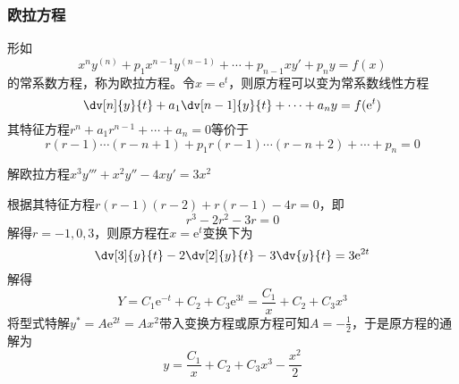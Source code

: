\subsubsection{欧拉方程}
形如
\[ x^ny^{(n)} + p_1x^{n-1}y^{(n-1)} + \cdots + p_{n-1}xy' + p_n y = f(x) \]
的常系数方程，称为欧拉方程。令$x=\mathrm{e}^t$，则原方程可以变为常系数线性方程
\[ \dv[n]{y}{t} + a_1\dv[n-1]{y}{t} + \cdots + a_ny = f(\mathrm{e}^t) \]
其特征方程$r^n + a_1r^{n-1}+\cdots+ a_n = 0$等价于
\[ r(r-1) \cdots (r-n+1) + p_1r(r-1) \cdots (r-n+2) + \cdots + p_n = 0 \]

\begin{example}
    解欧拉方程$x^3y''' + x^2y'' -4xy' = 3x^2$
\end{example}
\begin{solution}
    根据其特征方程$r(r-1)(r-2) + r(r-1) -4r = 0$，即
    \[ r^3 - 2r^2 -3r = 0 \]
    解得$r = -1,0,3$，则原方程在$x=\mathrm{e}^t$变换下为
    \[ \dv[3]{y}{t} -2\dv[2]{y}{t} - 3\dv{y}{t} = 3\mathrm{e}^{2t} \]
    解得
    \[ Y = C_1\mathrm{e}^{-t} + C_2 + C_3\mathrm{e}^{3t} = \frac{C_1}{x} + C_2 + C_3x^3 \]
    将型式特解$y^* = A\mathrm{e}^{2t} = Ax^2$带入变换方程或原方程可知$A = -\frac{1}{2}$，于是原方程的通解为
    \[ y = \frac{C_1}{x} + C_2 + C_3x^3 - \frac{x^2}{2} \]
\end{solution}